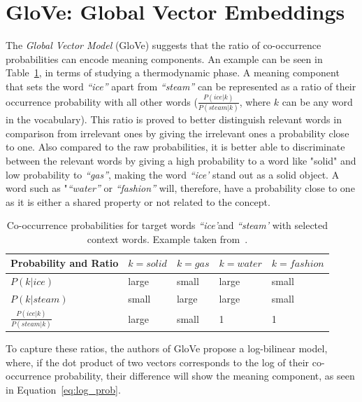 \section{GloVe: Global Vector Embeddings}
\label{sec:GloVe}
The \emph{Global Vector Model} (GloVe) suggests that the ratio of co-occurrence probabilities can encode meaning components. An example can be seen in Table~\ref{table:tab_1}, in terms of studying a thermodynamic phase. A meaning component that sets the word  \emph{``ice''} apart from \emph{``steam''} can be represented as  a ratio of their occurrence probability with all other words \big($\frac { P(ice|k) }{ P(steam|k) } $, where $k$ can be any word in the vocabulary\big). This ratio is proved to better distinguish relevant words in comparison from irrelevant ones by giving the irrelevant ones a probability close to one. Also compared to the raw probabilities, it is better able to discriminate
between the relevant words by giving a high probability to a word like "solid" and low probability to \emph{``gas''}, making the word \emph{``ice'} stand out as a solid object. A word such as "\emph{``water''} or \emph{``fashion''} will, therefore, have a probability close to one as it is either a shared property or not related to the concept.\\
\begin{table}[]
\centering

\begin{tabular}{@{}l|l|l|l|l@{}}
\toprule
Probability and Ratio &  $k=solid$& $k=gas$ & $k=water$ &$k= fashion$  \\ \midrule $P(k|ice)$& {\color[HTML]{CB0000}large} &  {\color[HTML]{329A9D}small} & {\color[HTML]{CB0000}large} & {\color[HTML]{329A9D}small} \\\midrule
  $P(k|steam)$&{\color[HTML]{329A9D}small}  & {\color[HTML]{CB0000}large} &  {\color[HTML]{CB0000}large}&{\color[HTML]{329A9D}small}  \\\midrule
 $\frac { P(ice|k) }{ P(steam|k) } $& {\color[HTML]{CB0000}large} &  {\color[HTML]{329A9D}small}&  1 &    1  \\\midrule
\end{tabular}%
\caption{Co-occurrence probabilities for target words \emph{``ice'}and \emph{``steam'} with selected context words. Example taken from~.}
\label{table:tab_1}
\end{table}

To capture these ratios, the authors of GloVe propose a log-bilinear model, where, if the dot product of two vectors corresponds to the log of their co-occurrence probability, their difference will show the meaning component, as seen in Equation~\ref{eq:log_prob}.

